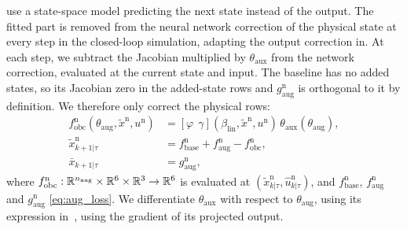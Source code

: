  use a state-space model predicting the next state instead of the output.
The fitted part is removed from the neural network correction of the
physical state at every step in the closed-loop simulation, adapting the output correction in.
At each step, we subtract the Jacobian  multiplied by
$\theta_{\mathrm{aux}}$ from the network correction,
evaluated at the current state and input.
%
The baseline has no added states, so its Jacobian  zero
in the added-state rows and $g^{\mathrm n}_{\mathrm{aug}}$
is orthogonal to it by definition.
We therefore only correct the physical rows:
\begin{equation}
\begin{aligned}
 f^{\mathrm n}_{\mathrm{obc}}(\theta_{\mathrm{aug}},\tilde x^{\mathrm n},u^{\mathrm n})
 &=[\varphi\ \ \gamma](\beta_{\mathrm{lin}},\tilde x^{\mathrm n},u^{\mathrm n})\,
  \theta_{\mathrm{aux}}(\theta_{\mathrm{aug}}),\\
 \tilde x^{\mathrm n}_{k+1|\tau}
 &=f^{\mathrm n}_{\mathrm{base}}+f^{\mathrm n}_{\mathrm{aug}}-f^{\mathrm n}_{\mathrm{obc}},\\
 \bar x_{k+1|\tau}&=g^{\mathrm n}_{\mathrm{aug}},
\end{aligned}
\label{eq:obc_corr}
\end{equation}
where
$f^{\mathrm n}_{\mathrm{obc}}:\mathbb{R}^{n_{\mathrm{aug}}}\times\mathbb{R}^6\times\mathbb{R}^3\to\mathbb{R}^6$
is evaluated at $(\tilde x^{\mathrm n}_{k|\tau},\hat u^{\mathrm n}_{k|\tau})$, and
$f^{\mathrm n}_{\mathrm{base}}$, $f^{\mathrm n}_{\mathrm{aug}}$ and
$g^{\mathrm n}_{\mathrm{aug}}$  \eqref{eq:aug_loss}.
We differentiate $\theta_{\mathrm{aux}}$ with respect to $\theta_{\mathrm{aug}}$, using its expression
in~\cite[Eq.~(8)]{gyorok2026obc},
 using the gradient of its projected output.
